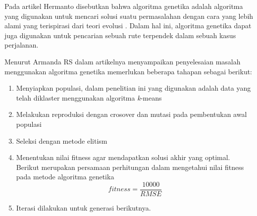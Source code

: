 Pada artikel Hermanto disebutkan bahwa algoritma genetika adalah algoritma yang digunakan untuk mencari solusi suatu permasalahan dengan cara yang lebih alami yang terispirasi dari teori evolusi  \cite{hermawanto2003algoritma}. Dalam hal ini, algoritma genetika dapat juga digunakan untuk pencarian sebuah rute terpendek dalam sebuah kasus perjalanan.

Menurut Armanda RS \cite{armanda2016penerapan} dalam artikelnya menyampaikan penyelesaian masalah menggunakan algoritma genetika memerlukan beberapa tahapan sebagai berikut:

\begin{enumerate}
	\item Menyiapkan populasi, dalam penelitian ini yang digunakan adalah data yang telah diklaster menggunakan algoritma \textit{k}-means
	\item Melakukan reproduksi dengan crosover dan mutasi pada pembentukan awal populasi
	\item Seleksi dengan metode elitism
	\item Menentukan nilai fitness agar mendapatkan solusi akhir yang optimal. Berikut merupakan persamaan perhitungan dalam mengetahui nilai fitness pada metode algoritma genetika
	\begin{equation}
	fitness=\frac{10000}{RMSE}
	\end{equation}
	\item Iterasi dilakukan untuk generasi berikutnya.
\end{enumerate}